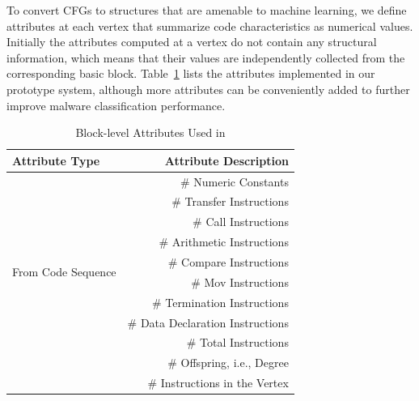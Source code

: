 


To convert CFGs to structures that are amenable to machine learning, we define attributes at each vertex that summarize code characteristics as numerical values.
Initially the attributes computed at a vertex do not contain any structural information, which means that their values are independently collected from the corresponding basic block.
Table~\ref{MG:Tab:UsedAttributes} lists the attributes implemented in our prototype system, although more attributes can be conveniently added to further improve malware classification performance.

\begin{table}[htbp]
    \begin{center}
        \caption{Block-level Attributes Used in \sysname}
        \begin{tabular}{lr}
            \hline
            \hline
            Attribute Type & Attribute Description \\
            \hline
            \multirow{10}{*}{From Code Sequence} & \# Numeric Constants \\
            & \# Transfer Instructions         \\
            & \# Call Instructions             \\
            & \# Arithmetic Instructions       \\
            & \# Compare Instructions          \\
            & \# Mov Instructions              \\
            & \# Termination Instructions      \\
            & \# Data Declaration Instructions \\
            & \# Total Instructions            \\
            \multirow{2}{*}{From Vertex Structure} & \# Offspring, i.e., Degree \\
            & \# Instructions in the Vertex    \\
            \hline
        \end{tabular}
        \label{MG:Tab:UsedAttributes}
    \end{center}
\end{table}

